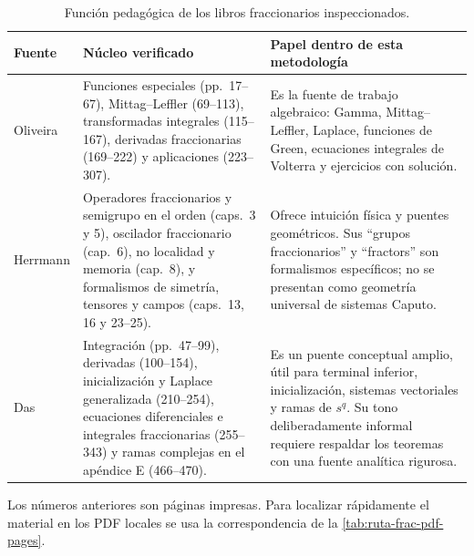 \begin{table}[H]
\centering
\caption{Función pedagógica de los libros fraccionarios inspeccionados.}
\label{tab:ruta-frac-books}
\small
\begin{tabularx}{\textwidth}{@{}L{0.24\textwidth}L{0.29\textwidth}Y@{}}
\toprule
Fuente & Núcleo verificado & Papel dentro de esta metodología \\
\midrule
Oliveira \cite{Oliveira2019SolvedFractional} &
Funciones especiales (pp.\ 17--67), Mittag--Leffler (69--113), transformadas
integrales (115--167), derivadas fraccionarias (169--222) y aplicaciones
(223--307). &
Es la fuente de trabajo algebraico: Gamma, Mittag--Leffler, Laplace,
funciones de Green, ecuaciones integrales de Volterra y ejercicios con
solución. \\
Herrmann \cite{Herrmann2014Fractional} &
Operadores fraccionarios y semigrupo en el orden (caps.\ 3 y 5), oscilador
fraccionario (cap.\ 6), no localidad y memoria (cap.\ 8), y formalismos de
simetría, tensores y campos (caps.\ 13, 16 y 23--25). &
Ofrece intuición física y puentes geométricos. Sus ``grupos fraccionarios'' y
``fractors'' son formalismos específicos; no se presentan como geometría
universal de sistemas Caputo. \\
Das \cite{Das2020Kindergarten} &
Integración (pp.\ 47--99), derivadas (100--154), inicialización y Laplace
generalizada (210--254), ecuaciones diferenciales e integrales fraccionarias
(255--343) y ramas complejas en el apéndice E (466--470). &
Es un puente conceptual amplio, útil para terminal inferior, inicialización,
sistemas vectoriales y ramas de \(s^q\). Su tono deliberadamente informal
requiere respaldar los teoremas con una fuente analítica rigurosa. \\
\bottomrule
\end{tabularx}
\end{table}

Los números anteriores son páginas impresas. Para localizar rápidamente el
material en los PDF locales se usa la correspondencia de la
\cref{tab:ruta-frac-pdf-pages}.

